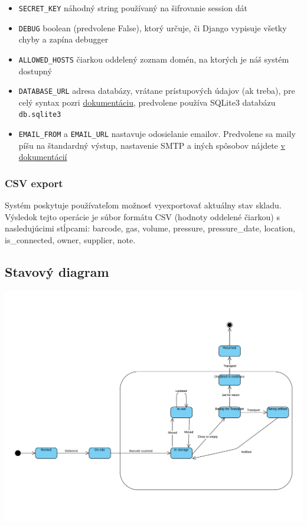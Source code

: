 \documentclass{zah}
\begin{document}
\begin{itemize}
	\item \texttt{SECRET\_KEY} náhodný string používaný na šifrovanie session dát
	\item \texttt{DEBUG} boolean (predvolene False), ktorý určuje, či Django vypisuje všetky chyby a zapína debugger
	\item \texttt{ALLOWED\_HOSTS} čiarkou oddelený zoznam domén, na ktorých je náš systém dostupný
	\item \texttt{DATABASE\_URL} adresa databázy, vrátane prístupových údajov (ak treba), pre celý syntax pozri \href{https://django-environ.readthedocs.io/en/latest/types.html#environ-env-db-url}{dokumentáciu}, predvolene používa SQLite3 databázu \texttt{db.sqlite3}
	\item \texttt{EMAIL\_FROM} a \texttt{EMAIL\_URL} nastavuje odosielanie emailov. Predvolene sa maily píšu na štandardný výstup, nastavenie SMTP a iných spôsobov nájdete \href{https://django-environ.readthedocs.io/en/latest/types.html#environ-env-email-url}{v dokumentácií}
\end{itemize}

\subsubsection{CSV export}

Systém poskytuje používateľom možnosť vyexportovať aktuálny stav skladu.
Výsledok tejto operácie je súbor formátu CSV (hodnoty oddelené čiarkou) s nasledujúcimi stĺpcami:
barcode, gas, volume, pressure, pressure\_date, location, is\_connected, owner, supplier, note.

\subsection{Stavový diagram}
\includegraphics[width=\textwidth]{navrh-assets/state}
\end{document}
